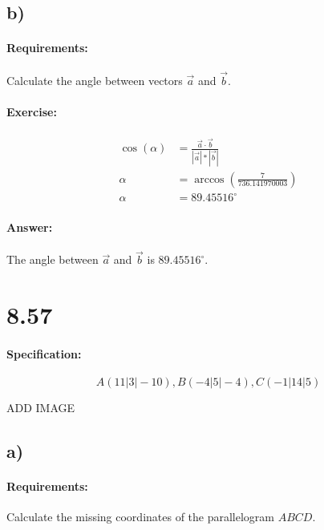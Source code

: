 \documentclass{article}
\begin{document}
\subsection{b)}

\paragraph{Requirements:}
Calculate the angle between vectors $\vec{a}$ and $\vec{b}$.

\paragraph{Exercise:}

\begin{align}
    \cos(\alpha) &= \frac{\vec{a} \cdot \vec{b}}{|\vec{a}| * |\vec{b}|} \\
    \alpha &= \arccos(\frac{7}{736.141970003}) \\
    \alpha &= 89.45516^\circ 
\end{align}

\paragraph{Answer:}
The angle between $\vec{a}$ and $\vec{b}$ is $89.45516^\circ$.

\pagebreak

\section{8.57}

\paragraph{Specification:}

\begin{equation}
    A(11|3|-10), B(-4|5|-4), C(-1|14|5)
\end{equation}

ADD IMAGE

\subsection{a)}

\paragraph{Requirements:}
Calculate the missing coordinates of the parallelogram $ABCD$.
\end{document}
